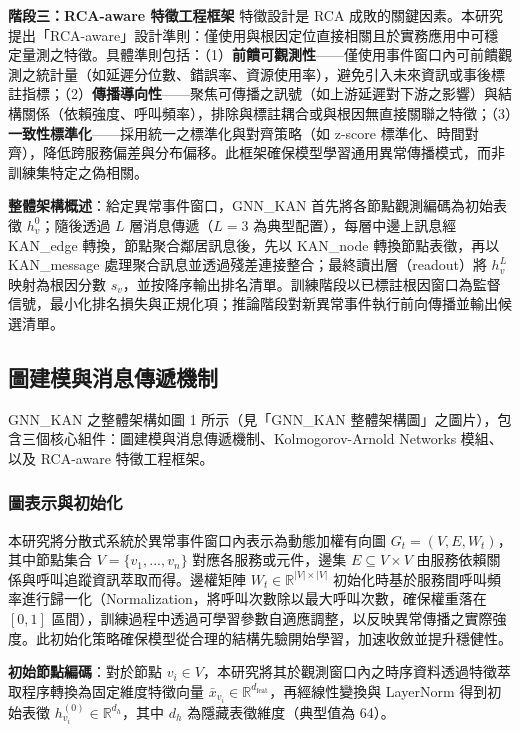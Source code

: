 \documentclass[10pt,a4paper,twocolumn]{article}
\begin{document}
\textbf{階段三：RCA-aware 特徵工程框架}  
特徵設計是 RCA 成敗的關鍵因素。本研究提出「RCA-aware」設計準則：僅使用與根因定位直接相關且於實務應用中可穩定量測之特徵。具體準則包括：（1）\textbf{前饋可觀測性}——僅使用事件窗口內可前饋觀測之統計量（如延遲分位數、錯誤率、資源使用率），避免引入未來資訊或事後標註指標；（2）\textbf{傳播導向性}——聚焦可傳播之訊號（如上游延遲對下游之影響）與結構關係（依賴強度、呼叫頻率），排除與標註耦合或與根因無直接關聯之特徵；（3）\textbf{一致性標準化}——採用統一之標準化與對齊策略（如 z-score 標準化、時間對齊），降低跨服務偏差與分布偏移。此框架確保模型學習通用異常傳播模式，而非訓練集特定之偽相關。

\textbf{整體架構概述}：給定異常事件窗口，GNN\_KAN 首先將各節點觀測編碼為初始表徵 $h_v^0$；隨後透過 $L$ 層消息傳遞（$L=3$ 為典型配置），每層中邊上訊息經 KAN\_edge 轉換，節點聚合鄰居訊息後，先以 KAN\_node 轉換節點表徵，再以 KAN\_message 處理聚合訊息並透過殘差連接整合；最終讀出層（readout）將 $h_v^L$ 映射為根因分數 $s_v$，並按降序輸出排名清單。訓練階段以已標註根因窗口為監督信號，最小化排名損失與正規化項；推論階段對新異常事件執行前向傳播並輸出候選清單。

\subsection{圖建模與消息傳遞機制}

GNN\_KAN 之整體架構如圖 1 所示（見「GNN\_KAN 整體架構圖」之圖片），包含三個核心組件：圖建模與消息傳遞機制、Kolmogorov-Arnold Networks 模組、以及 RCA-aware 特徵工程框架。

\subsubsection{圖表示與初始化}

本研究將分散式系統於異常事件窗口內表示為動態加權有向圖 $G_t = (V, E, W_t)$，其中節點集合 $V = \{v_1, ..., v_n\}$ 對應各服務或元件，邊集 $E \subseteq V \times V$ 由服務依賴關係與呼叫追蹤資訊萃取而得。邊權矩陣 $W_t \in \mathbb{R}^{|V| \times |V|}$ 初始化時基於服務間呼叫頻率進行歸一化（Normalization，將呼叫次數除以最大呼叫次數，確保權重落在 $[0, 1]$ 區間），訓練過程中透過可學習參數自適應調整，以反映異常傳播之實際強度。此初始化策略確保模型從合理的結構先驗開始學習，加速收斂並提升穩健性。

\textbf{初始節點編碼}：對於節點 $v_i \in V$，本研究將其於觀測窗口內之時序資料透過特徵萃取程序轉換為固定維度特徵向量 $\bar{x}_{v_i} \in \mathbb{R}^{d_{\text{feat}}}$，再經線性變換與 LayerNorm 得到初始表徵 $h_{v_i}^{(0)} \in \mathbb{R}^{d_h}$，其中 $d_h$ 為隱藏表徵維度（典型值為 64）。
\end{document}
